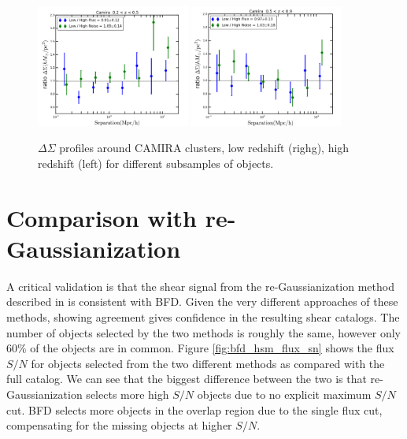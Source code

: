\documentclass[useAMS,usenatbib]{mnras}
\begin{document}
\begin{figure}
    \includegraphics[width=0.45\textwidth]{dsigma_consistent_lowz.png}
    \includegraphics[width=0.45\textwidth]{dsigma_consistent_highz.png}
    \caption{
    $\Delta\Sigma$ profiles around CAMIRA clusters, low redshift (righg), high redshift (left) for different subsamples of objects.
}
    \label{fig:dsigma_consistent}
\end{figure}



\section{Comparison with re-Gaussianization}
\label{Sec:Comparison}

A critical validation is that the shear signal from the re-Gaussianization method described in \cite{ShearPaper:inprep} is consistent with BFD.  Given the very different approaches of these methods, showing agreement gives confidence in the resulting shear catalogs. The number of objects selected by the two methods is roughly the same, however only 60$\%$ of the objects are in common.  Figure \ref{fig:bfd_hsm_flux_sn} shows the flux $S/N$ for objects selected from the two different methods as compared with the full catalog.  We can see that the biggest difference between the two is that re-Gaussianization selects more high $S/N$ objects due to no explicit maximum $S/N$ cut.  BFD selects more objects in the overlap region due to the single flux cut, compensating for the missing objects at higher $S/N$.
\end{document}
